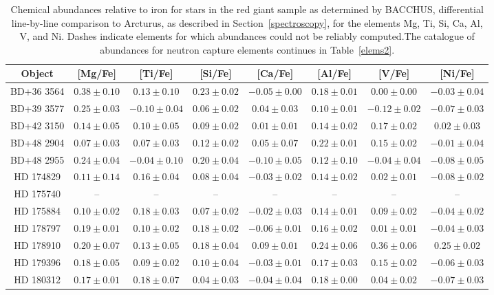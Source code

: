 \begin{table*}
\caption{Chemical abundances relative to iron for stars in the red giant sample as determined by BACCHUS,  differential line-by-line comparison to Arcturus, as described in Section~\ref{spectroscopy}, for the elements Mg, Ti, Si, Ca, Al, V, and Ni. Dashes indicate elements for which abundances could not be reliably computed.The catalogue of abundances for neutron capture elements continues in Table~\ref{elems2}.\label{elems1}}
\begin{tabular}{cccccccc}
\hline \hline
Object & [Mg/Fe] & [Ti/Fe] & [Si/Fe] & [Ca/Fe] & [Al/Fe] & [V/Fe] & [Ni/Fe] \\
\hline
BD+36 3564 & $0.38 \pm 0.10$ & $0.13 \pm 0.10$ & $0.23 \pm 0.02$ & $-0.05 \pm 0.00$ & $0.18 \pm 0.01$ & $0.00 \pm 0.00$ & $-0.03 \pm 0.04$ \\
BD+39 3577 & $0.25 \pm 0.03$ & $-0.10 \pm 0.04$ & $0.06 \pm 0.02$ & $0.04 \pm 0.03$ & $0.10 \pm 0.01$ & $-0.12 \pm 0.02$ & $-0.07 \pm 0.03$ \\
BD+42 3150 & $0.14 \pm 0.05$ & $0.10 \pm 0.05$ & $0.09 \pm 0.02$ & $0.01 \pm 0.01$ & $0.14 \pm 0.02$ & $0.17 \pm 0.02$ & $0.02 \pm 0.03$ \\
BD+48 2904 & $0.07 \pm 0.03$ & $0.07 \pm 0.03$ & $0.12 \pm 0.02$ & $0.05 \pm 0.07$ & $0.22 \pm 0.01$ & $0.15 \pm 0.02$ & $-0.01 \pm 0.04$ \\
BD+48 2955 & $0.24 \pm 0.04$ & $-0.04 \pm 0.10$ & $0.20 \pm 0.04$ & $-0.10 \pm 0.05$ & $0.12 \pm 0.10$ & $-0.04 \pm 0.04$ & $-0.08 \pm 0.05$ \\
HD 174829 & $0.11 \pm 0.14$ & $0.16 \pm 0.04$ & $0.08 \pm 0.04$ & $-0.03 \pm 0.02$ & $0.14 \pm 0.02$ & $0.02 \pm 0.01$ & $-0.08 \pm 0.02$ \\
HD 175740 & -- & -- & -- & -- & -- & -- & -- \\
HD 175884 & $0.10 \pm 0.02$ & $0.18 \pm 0.03$ & $0.07 \pm 0.02$ & $-0.02 \pm 0.03$ & $0.14 \pm 0.01$ & $0.09 \pm 0.02$ & $-0.04 \pm 0.02$ \\
HD 178797 & $0.19 \pm 0.01$ & $0.10 \pm 0.02$ & $0.18 \pm 0.02$ & $-0.06 \pm 0.01$ & $0.16 \pm 0.02$ & $0.01 \pm 0.01$ & $-0.04 \pm 0.03$ \\
HD 178910 & $0.20 \pm 0.07$ & $0.13 \pm 0.05$ & $0.18 \pm 0.04$ & $0.09 \pm 0.01$ & $0.24 \pm 0.06$ & $0.36 \pm 0.06$ & $0.25 \pm 0.02$ \\
HD 179396 & $0.18 \pm 0.05$ & $0.09 \pm 0.02$ & $0.10 \pm 0.04$ & $-0.03 \pm 0.01$ & $0.17 \pm 0.03$ & $0.15 \pm 0.02$ & $-0.06 \pm 0.03$ \\
HD 180312 & $0.17 \pm 0.01$ & $0.18 \pm 0.07$ & $0.04 \pm 0.03$ & $-0.04 \pm 0.04$ & $0.18 \pm 0.00$ & $0.04 \pm 0.02$ & $-0.07 \pm 0.03$ \\

\end{tabular}
\end{table*}
